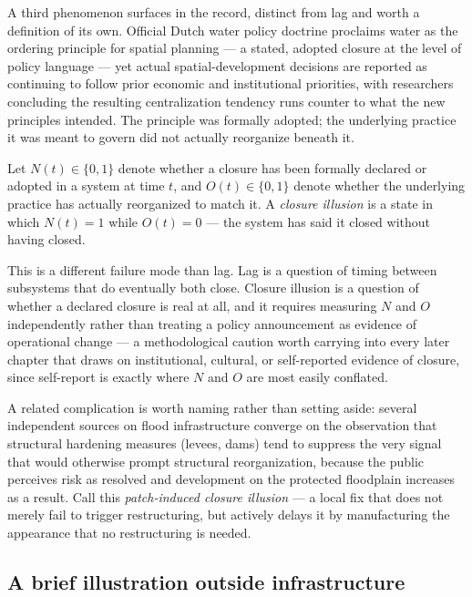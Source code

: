 A third phenomenon surfaces in the record, distinct from lag and worth a definition of its own. Official Dutch water policy doctrine proclaims water as the ordering principle for spatial planning --- a stated, adopted closure at the level of policy language --- yet actual spatial-development decisions are reported as continuing to follow prior economic and institutional priorities, with researchers concluding the resulting centralization tendency runs counter to what the new principles intended. The principle was formally adopted; the underlying practice it was meant to govern did not actually reorganize beneath it.

\begin{definition}
Let $N(t) \in \{0,1\}$ denote whether a closure has been formally declared or adopted in a system at time $t$, and $O(t) \in \{0,1\}$ denote whether the underlying practice has actually reorganized to match it. A \emph{closure illusion} is a state in which $N(t) = 1$ while $O(t) = 0$ --- the system has said it closed without having closed.
\end{definition}

This is a different failure mode than lag. Lag is a question of timing between subsystems that do eventually both close. Closure illusion is a question of whether a declared closure is real at all, and it requires measuring $N$ and $O$ independently rather than treating a policy announcement as evidence of operational change --- a methodological caution worth carrying into every later chapter that draws on institutional, cultural, or self-reported evidence of closure, since self-report is exactly where $N$ and $O$ are most easily conflated.

A related complication is worth naming rather than setting aside: several independent sources on flood infrastructure converge on the observation that structural hardening measures (levees, dams) tend to suppress the very signal that would otherwise prompt structural reorganization, because the public perceives risk as resolved and development on the protected floodplain increases as a result. Call this \emph{patch-induced closure illusion} --- a local fix that does not merely fail to trigger restructuring, but actively delays it by manufacturing the appearance that no restructuring is needed.

\subsection*{A brief illustration outside infrastructure}

